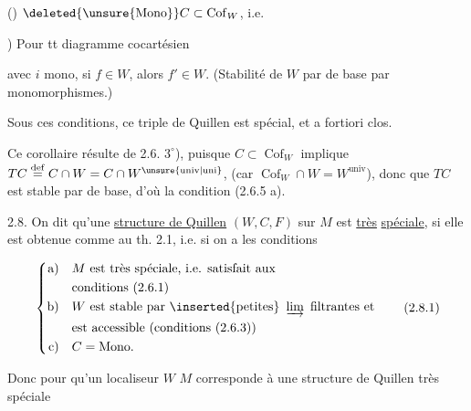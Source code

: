 
() $\deleted{\unsure{\mathrm{Mono}}}C\subset\operatorname{Cof}_W$, i.e. 

) Pour tt diagramme cocartésien


avec $i$ mono, si $f\in W$, alors $f'\in W$.
(Stabilité de $W$ par  de base
par monomorphismes.)

Sous ces conditions, ce triple de Quillen est
spécial, et a fortiori clos.

Ce corollaire résulte de 2.6. $3^\circ$), puisque
$C\subset\operatorname{Cof}_W$ implique $TC\overset{\mathrm{def}}{=}C\cap W=C\cap W^{\unsure{\mathrm{univ}|\mathrm{uni}}}$,
 (car $\operatorname{Cof}_W\cap W=W^{\mathrm{univ}}$), donc que
$TC$ est stable par  de base, d'où la
condition (2.6.5 a).

2.8. On dit qu'une \uline{structure de Quillen}
$(W,C,F)$ sur $M$ est \uline{très} \uline{spéciale}, si elle
est obtenue comme au th. 2.1, i.e.
si on a les conditions

\[
\left\{\begin{aligned}
\text{a)}\quad & M\ \text{est très spéciale, i.e. satisfait aux}\\
 &\text{conditions (2.6.1)}\\
\text{b)}\quad & W\ \text{est stable par }\inserted{\text{petites}}\ \varinjlim\ \text{filtrantes et}\\
 &\text{est accessible (conditions (2.6.3))}\\
\text{c)}\quad & C=\mathrm{Mono}.
\end{aligned}\right.\tag*{(2.8.1)}
\]

Donc pour qu'un localiseur $W$  $M$ corresponde
à une structure de Quillen  très spéciale
